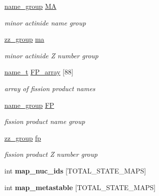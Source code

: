 \begin{DoxyCompactItemize}
\mbox{\label{namespacepyne_1_1nucname_a361c7b8fb365a6e606ab45ef8b5688d8}} 
\hyperlink{namespacepyne_1_1nucname_a8959cfbd85b0ccc8b51ca14e98de9791}{name\+\_\+group} \hyperlink{namespacepyne_1_1nucname_a361c7b8fb365a6e606ab45ef8b5688d8}{MA}
\begin{DoxyCompactList}\small\item\em minor actinide name group \end{DoxyCompactList}\item 
\hyperlink{namespacepyne_1_1nucname_a2e9463e61005389bbc50bfa210061582}{zz\+\_\+group} \hyperlink{namespacepyne_1_1nucname_ac487913e792a1d98664af236f1c567b7}{ma}
\begin{DoxyCompactList}\small\item\em minor actinide Z number group \end{DoxyCompactList}\item 
\hyperlink{namespacepyne_1_1nucname_aed6b656cde69b79b33f6af37fabb2054}{name\+\_\+t} \hyperlink{namespacepyne_1_1nucname_a57a7016ca0ac1283ab5ca3fce0230114}{F\+P\+\_\+array} \mbox{[}88\mbox{]}
\begin{DoxyCompactList}\small\item\em array of fission product names \end{DoxyCompactList}\item 
\mbox{\label{namespacepyne_1_1nucname_ac2ae7f6893d6871fde8b78a928e6f2c5}} 
\hyperlink{namespacepyne_1_1nucname_a8959cfbd85b0ccc8b51ca14e98de9791}{name\+\_\+group} \hyperlink{namespacepyne_1_1nucname_ac2ae7f6893d6871fde8b78a928e6f2c5}{FP}
\begin{DoxyCompactList}\small\item\em fission product name group \end{DoxyCompactList}\item 
\hyperlink{namespacepyne_1_1nucname_a2e9463e61005389bbc50bfa210061582}{zz\+\_\+group} \hyperlink{namespacepyne_1_1nucname_af68a1a81d3f03a77d9f7df73254d3b94}{fp}
\begin{DoxyCompactList}\small\item\em fission product Z number group \end{DoxyCompactList}\item 
\mbox{\label{namespacepyne_1_1nucname_a383c8839be813cca0a5b40d8253d5a69}} 
int {\bfseries map\+\_\+nuc\+\_\+ids} \mbox{[}T\+O\+T\+A\+L\+\_\+\+S\+T\+A\+T\+E\+\_\+\+M\+A\+PS\mbox{]}
\item 
\mbox{\label{namespacepyne_1_1nucname_a3b1a5e863d6aad86105c9e62ec8fa7ad}} 
int {\bfseries map\+\_\+metastable} \mbox{[}T\+O\+T\+A\+L\+\_\+\+S\+T\+A\+T\+E\+\_\+\+M\+A\+PS\mbox{]}
\end{DoxyCompactItemize}
